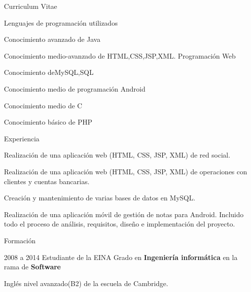 \begin{cv}{Curriculum Vitae}
	
\begin{cvlist}{Lenguajes de programación utilizados}
\item Conocimiento avanzado de Java
\item Conocimiento medio-avanzado de HTML,CSS,JSP,XML. Programación Web
\item Conocimiento deMySQL,SQL
\item Conocimiento medio de programación Android
\item Conocimiento medio de C
\item Conocimiento básico de PHP
\end{cvlist}

\begin{cvlist}{Experiencia}

	\item Realización de una aplicación web (HTML, CSS, JSP, XML) de red social.
	\item Realización de una aplicación web (HTML, CSS, JSP, XML) de operaciones con clientes y
cuentas bancarias.
	\item Creación y mantenimiento de varias bases de datos en MySQL.
	\item Realización de una aplicación móvil de gestión de notas para Android. Incluido todo el
proceso de análisis, requisitos, diseño e implementación del proyecto.

\end{cvlist}

\begin{cvlist}{Formación}

	\item[2008 a 2014] Estudiante de la EINA
		Grado en \textbf{Ingeniería informática} en la rama de \textbf{Software}\\
	\item[Inglés]  nivel avanzado(B2) de la escuela de Cambridge.


\end{cvlist}

\end{cv}